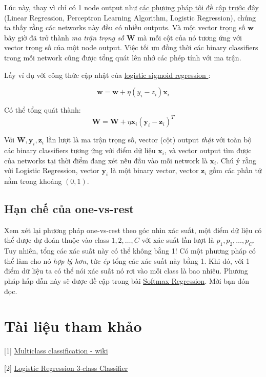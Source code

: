  
Lúc này, thay vì chỉ có 1 node output như \href{http://machinelearningcoban.com/2017/01/27/logisticregression/#-thao-luan}{các phương pháp tôi đề cập trước đây} (Linear Regression, Perceptron Learning Algorithm, Logistic Regression), chúng ta thấy rằng các networks này đều có nhiều outputs. Và một vector trọng số $\mathbf{w}$ bây giờ đã trở thành \textit{ma trận trọng số} $\mathbf{W}$ mà mỗi cột của nó tương ứng với vector trọng số của một node output. Việc tối ưu đồng thời các binary classifiers trong mỗi network cũng được tổng quát lên nhớ các phép tính với ma trận.  
 
Lấy ví dụ với công thức cập nhật của \href{http://machinelearningcoban.com/2017/01/27/logisticregression/#cong-thuc-cap-nhat-cho-logistic-sigmoid-regression}{logistic sigmoid regression }: 
 
\begin{equation*} 
\mathbf{w} = \mathbf{w} + \eta(y_i - z_i)\mathbf{x}_i 
\end{equation*} 
 
Có thể tổng quát thành: 
\begin{equation*} 
\mathbf{W} = \mathbf{W} + \eta\mathbf{x}_i(\mathbf{y}_i - \mathbf{z}_i)^T 
\end{equation*} 
 
Với $\mathbf{W}, \mathbf{y}_i, \mathbf{z}_i$ lần lượt là ma trận trọng số, vector (cột) output \textit{thật} với toàn bộ các binary classifiers tương ứng với điểm dữ liệu $\mathbf{x}_i$, và vector output tìm được của networks tại thời điểm đang xét nếu đầu vào mỗi network là $\mathbf{x}_i$. Chú ý rằng với Logistic Regression, vector $\mathbf{y}_i$ là một binary vector, vector $\mathbf{z}_i$ gồm các phần tử nằm trong khoảng $(0, 1)$.  
 
 
\subsection{Hạn chế của one-vs-rest}
Xem xét lại phương pháp one-vs-rest theo góc nhìn xác suất, một điểm dữ liệu có thể được dự đoán thuộc vào class $1, 2, \dots, C$ với xác suất lần lượt là $p_1, p_2, \dots, p_C$. Tuy nhiên, tổng các xác suất này có thể không bằng 1! Có một phương pháp có thể làm cho nó \textit{hợp lý hơn}, tức \textit{ép} tổng các xác suất này bằng 1. Khi đó, với 1 điểm dữ liệu ta có thể nói xác suất nó rơi vào mỗi class là bao nhiêu. Phương pháp hấp dẫn này sẽ được đề cập trong bài \href{http://machinelearningcoban.com/2017/02/16/softmax/}{Softmax Regression}. Mời bạn đón đọc. 
 
 
\section{Tài liệu tham khảo}
 
 
[1] \href{https://en.wikipedia.org/wiki/Multiclass_classification}{Multiclass classification - wiki} 
 
[2] \href{http://scikit-learn.org/stable/auto_examples/linear_model/plot_iris_logistic.html}{Logistic Regression 3-class Classifier} 
